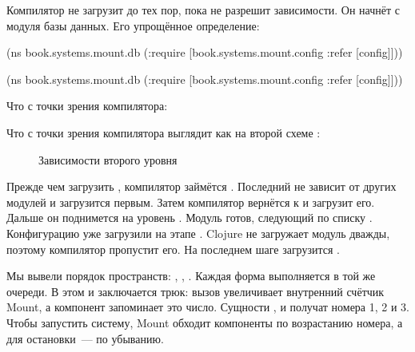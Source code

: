 \fi

Компилятор не загрузит  до тех пор, пока не разрешит
зависимости. Он начнёт с модуля базы данных. Его упрощённое определение:

\ifnarrow

\begin{clojure}
(ns book.systems.mount.db
  (:require
   [book.systems.mount.config
    :refer [config]]))
\end{clojure}

\else

\begin{clojure}
(ns book.systems.mount.db
  (:require
   [book.systems.mount.config :refer [config]]))
\end{clojure}

\fi

\ifprint

\noindent
Что с точки зрения компилятора:

\begin{figure}[h!]
\end{figure}

\fi

\ifebook

\noindent
Что с точки зрения компилятора выглядит как на второй схеме
:

\begin{figure}[b!]
  \caption{Зависимости второго уровня}
  \label{fig:chart-sys-3}
\end{figure}

\fi

Прежде чем загрузить , компилятор займётся . Последний
не зависит от других модулей и загрузится первым. Затем компилятор вернётся к
 и загрузит его. Дальше он поднимется на уровень
. Модуль  готов, следующий по списку
. Конфигурацию уже загрузили на этапе . Clojure не
загружает модуль дважды, поэтому компилятор пропустит его. На последнем шаге
загрузится .


Мы вывели порядок пространств: , , . Каждая
форма  выполняется в той же очереди. В этом и заключается трюк:
вызов  увеличивает внутренний счётчик Mount, а компонент
запоминает это число. Сущности ,  и  получат
номера 1, 2 и 3. Чтобы запустить систему, Mount обходит компоненты по
возрастанию номера, а для остановки~--- по убыванию.

